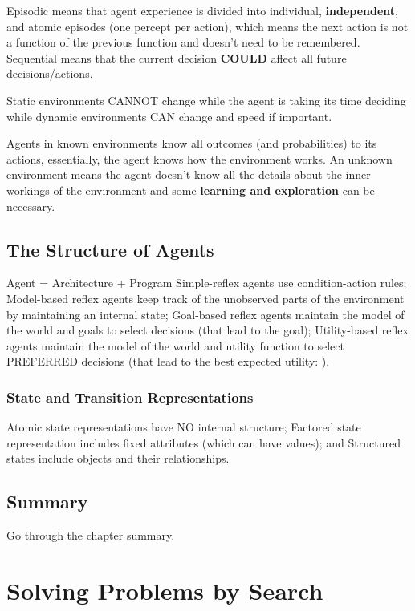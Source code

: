 \documentclass[exam={Midterm},color=true]{cs581exam}
\renewcommand{\emph}[1]{\textbf{#1}}
\begin{document}
Episodic means that agent experience is divided into individual, \emph{independent}, and atomic episodes (one percept per action),
which means the next action is not a function of the previous function and doesn't need to be remembered.
Sequential means that the current decision \emph{COULD} affect all future decisions/actions.

Static environments CANNOT change while the agent is taking its time deciding while dynamic environments CAN change and speed if important.

Agents in known environments know all outcomes (and probabilities) to its actions, essentially, the agent knows how the environment works.
An unknown environment means the agent doesn't know all the details about the inner workings of the environment and some \emph{learning and exploration} can be necessary.
%
\subsection{The Structure of Agents}\label{subsec:2.4}
Agent = Architecture + Program
Simple-reflex agents use condition-action rules;
Model-based reflex agents keep track of the unobserved parts of the environment by maintaining an internal state;
Goal-based reflex agents maintain the model of the world and goals to select decisions (that lead to the goal);
Utility-based reflex agents maintain the model of the world and utility function to select PREFERRED decisions (that lead to the best expected utility: ).

\subsubsection{State and Transition Representations}\label{subsubsec:state-and-transition-representations}
Atomic state representations have NO internal structure;
Factored state representation includes fixed attributes (which can have values);
and Structured states include objects and their relationships.

%
\subsection{Summary}\label{subsec:2-summary}
Go through the chapter summary.

\section{Solving Problems by Search}\label{sec:solving-problems-by-search}
\end{document}
